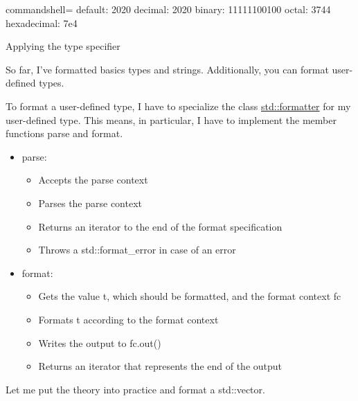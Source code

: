 \begin{tcblisting}{commandshell={}}
default:     2020
decimal:     2020
binary:      11111100100
octal:       3744
hexadecimal: 7e4
\end{tcblisting}

\begin{center}
Applying the type specifier
\end{center}

So far, I’ve formatted basics types and strings. Additionally, you can format user-defined types.


To format a user-defined type, I have to specialize the class \href{https://en.cppreference.com/w/cpp/utility/format/formatter}{std::formatter} for my user-defined type. This means, in particular, I have to implement the member functions parse and format.

\begin{itemize}
\item 
parse:
\begin{itemize}
\item 
Accepts the parse context

\item 
Parses the parse context

\item 
Returns an iterator to the end of the format specification

\item 
Throws a std::format\_error in case of an error
\end{itemize}

\item 
format:
\begin{itemize}
\item 
Gets the value t, which should be formatted, and the format context fc

\item 
Formats t according to the format context

\item 
Writes the output to fc.out()

\item 
Returns an iterator that represents the end of the output
\end{itemize}
\end{itemize}

Let me put the theory into practice and format a std::vector.

